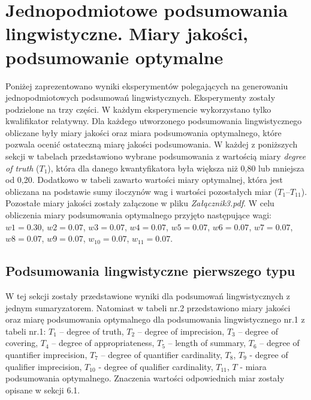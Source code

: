 \documentclass{article}
\begin{document}
\section{ Jednopodmiotowe podsumowania lingwistyczne. Miary jakości, podsumowanie optymalne}
Poniżej zaprezentowano wyniki eksperymentów polegających na generowaniu jednopodmiotowych podsumowań lingwistycznych. Eksperymenty zostały podzielone na trzy części. W każdym eksperymencie wykorzystano tylko kwalifikator relatywny. Dla każdego utworzonego podsumowania lingwistycznego obliczane były miary jakości oraz miara podsumowania optymalnego, które pozwala ocenić ostateczną miarę jakości podsumowania. W każdej z poniższych sekcji w tabelach przedstawiono wybrane podsumowania z wartością miary \textit{degree of truth} (\(T_1\)), która dla danego kwantyfikatora była większa niż 0{,}80 lub mniejsza od 0{,}20. Dodatkowo w tabeli zawarto wartości miary optymalnej, która jest obliczana na podstawie sumy iloczynów wag i wartości pozostałych miar (\(T_1\)–\(T_{11}\)). Pozostałe miary jakości zostały załączone w pliku \textit{Załącznik3.pdf}. W celu obliczenia miary podsumowania optymalnego przyjęto następujące wagi: \(w1 = 0.30\), \(w2 = 0.07\), \(w3 = 0.07\), \(w4 = 0.07\), \(w5 = 0.07\), \(w6 = 0.07\), \(w7 = 0.07\), \(w8 = 0.07\), \(w9 = 0.07\), \(w_{10} = 0.07\), \(w_{11} = 0.07\).


\subsection{Podsumowania lingwistyczne pierwszego typu}
W tej sekcji zostały przedstawione wyniki dla podsumowań lingwistycznych z jednym sumaryzatorem. Natomiast w tabeli nr.2 przedstawiono miary jakości oraz miarę podsumowania optymalnego dla podsumowania lingwistycznego nr.1 z tabeli nr.1:  \(T_1\) – degree of truth, \(T_2\) – degree of imprecision, \(T_3\) – degree of covering, \(T_4\) – degree of appropriateness, \(T_5\) – length of summary, \(T_6\) – degree of quantifier imprecision, \(T_7\) – degree of quantifier cardinality, \(T_8\), \(T_9\) - degree of qualifier imprecision, \(T_{10}\) - degree of qualifier cardinality, \(T_{11}\), \(T\) - miara podsumowania optymalnego. Znaczenia wartości odpowiednich miar zostały opisane w sekcji 6.1.
\end{document}
